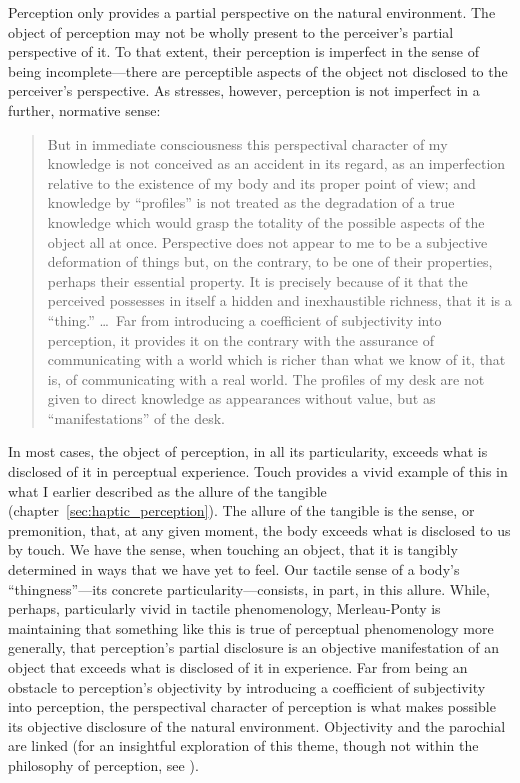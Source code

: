 Perception only provides a partial perspective on the natural environment. The object of perception may not be wholly present to the perceiver's partial perspective of it. To that extent, their perception is imperfect in the sense of being incom\-plete---there are perceptible aspects of the object not disclosed to the perceiver's perspective. As \citet[]{Merleau-Ponty:1964aa} stresses, however, perception is not imperfect in a further, normative sense:
\begin{quote}
	But in immediate consciousness this perspectival character of my knowledge is not conceived as an accident in its regard, as an imperfection relative to the existence of my body and its proper point of view; and knowledge by ``profiles'' is not treated as the degradation of a true knowledge which would grasp the totality of the possible aspects of the object all at once. Perspective does not appear to me to be a subjective deformation of things but, on the contrary, to be one of their properties, perhaps their essential property. It is precisely because of it that the perceived possesses in itself a hidden and inexhaustible richness, that it is a ``thing.'' \ldots\ Far from introducing a coefficient of subjectivity into perception, it provides it on the contrary with the assurance of communicating with a world which is richer than what we know of it, that is, of communicating with a real world. The profiles of my desk are not given to direct knowledge as appearances without value, but as ``manifestations'' of the desk. \citep[186]{Merleau-Ponty:1964ab}
\end{quote}
In most cases, the object of perception, in all its particularity, exceeds what is disclosed of it in perceptual experience. Touch provides a vivid example of this in what I earlier described as the allure of the tangible (chapter~\ref{sec:haptic_perception}). The allure of the tangible is the sense, or premonition, that, at any given moment, the body exceeds what is disclosed to us by touch. We have the sense, when touching an object, that it is tangibly determined in ways that we have yet to feel. Our tactile sense of a body's ``thingness''---its concrete particularity---consists, in part, in this allure. While, perhaps, particularly vivid in tactile phenomenology, Merleau-Ponty is maintaining that something like this is true of perceptual phenomenology more generally, that perception's partial disclosure is an objective manifestation of an object that exceeds what is disclosed of it in experience. Far from being an obstacle to perception's objectivity by introducing a coefficient of subjectivity into perception, the perspectival character of perception is what makes possible its objective disclosure of the natural environment. Objectivity and the parochial are linked (for an insightful exploration of this theme, though not within the philosophy of perception, see \citealt{Travis:2011qd}).

